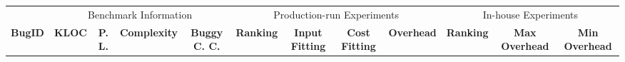 \begin{table*}[h!]
  \centering
  \tiny
  {
  \newcommand{\Yes}[1]{\checkmark{}$_#1$}
  \newcommand{\No}[0]{-}
  {
  \begin{tabular}{lcccc|cccc|ccc}
    \toprule
        & \multicolumn{4}{c}{Benchmark Information} & \multicolumn{4}{c}{Production-run Experiments} & \multicolumn{3}{c}{In-house Experiments}   \\

    \cmidrule(lr){2-5}
    \cmidrule(lr){6-9}
    \cmidrule(lr){10-12}
    {\bf BugID}    & {\bf KLOC} & {\bf P. L.} & {\bf Complexity} & {\bf Buggy C. C.} & {\bf Ranking} & {\bf Input Fitting} & {\bf Cost Fitting} & {\bf Overhead} & {\bf Ranking} & {\bf Max Overhead} & {\bf Min Overhead} \\
    \midrule


\end{tabular}}}
\end{table*}
